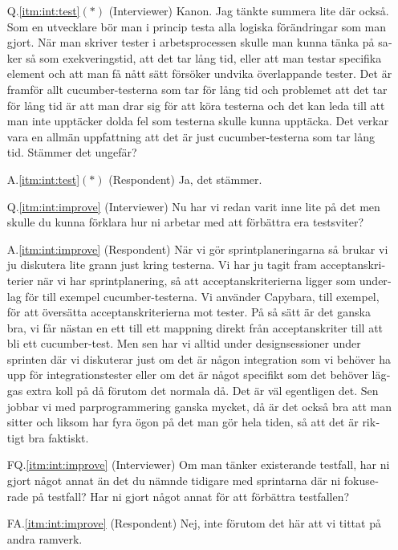 \begin{otherlanguage}{swedish}
\begin{itemize}
  \item[Q.\ref{itm:int:test}$(*)$] (Interviewer) Kanon. Jag tänkte summera lite där också. Som en utvecklare bör man i princip testa alla logiska förändringar som man gjort. När man skriver tester i arbetsprocessen skulle man kunna tänka på saker så som exekveringstid, att det tar lång tid, eller att man testar specifika element och att man få nått sätt försöker undvika överlappande tester. Det är framför allt cucumber-testerna som tar för lång tid och problemet att det tar för lång tid är att man drar sig för att köra testerna och det kan leda till att man inte upptäcker dolda fel som testerna skulle kunna upptäcka. Det verkar vara en allmän uppfattning att det är just cucumber-testerna som tar lång tid. Stämmer det ungefär?
  \item[A.\ref{itm:int:test}$(*)$] (Respondent) Ja, det stämmer.
  
\noindent\makebox[\linewidth]{\rule{\textwidth}{0.4pt}}

  \item[Q.\ref{itm:int:improve}] (Interviewer) Nu har vi redan varit inne lite på det men skulle du kunna förklara hur ni arbetar med att förbättra era testsviter?
  \item[A.\ref{itm:int:improve}] (Respondent) När vi gör sprintplaneringarna så brukar vi ju diskutera lite grann just kring testerna. Vi har ju tagit fram acceptanskriterier när vi har sprintplanering, så att acceptanskriterierna ligger som underlag för till exempel cucumber-testerna. Vi använder Capybara, till exempel, för att översätta acceptanskriterierna mot tester. På så sätt är det ganska bra, vi får nästan  en ett till ett mappning direkt från acceptanskriter till att bli ett cucumber-test. Men sen har vi alltid under designsessioner under sprinten där vi diskuterar just om det är någon integration som vi behöver ha upp för integrationstester eller om det är något specifikt som det behöver läggas extra koll på då förutom det normala då. Det är väl egentligen det. Sen jobbar vi med parprogrammering ganska mycket, då är det också bra att man sitter och liksom har fyra ögon på det man gör hela tiden, så att det är riktigt bra faktiskt.

  \item[FQ.\ref{itm:int:improve}] (Interviewer) Om man tänker existerande testfall, har ni gjort något annat än det du nämnde tidigare med sprintarna där ni fokuserade på testfall? Har ni gjort något annat för att förbättra testfallen?
  \item[FA.\ref{itm:int:improve}] (Respondent) Nej, inte förutom det här att vi tittat på andra ramverk.


\end{itemize}
\end{otherlanguage}
